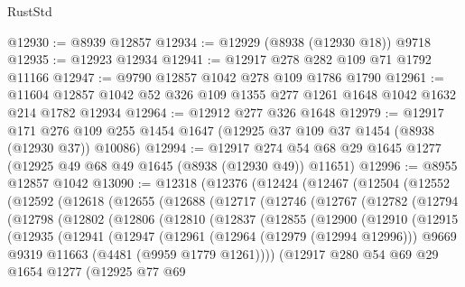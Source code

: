 \begin{lexlean}{RustStd}
\begin{coremodule}
@12930 := @8939 @12857
@12934 := @12929 (@8938 (@12930 @18)) @9718
@12935 := @12923 @12934
@12941 := @12917 @278 @282 @109 @71 @1792 @11166
@12947 := @9790 @12857 @1042 @278 @109 @1786 @1790
@12961 := @11604 @12857 @1042 @52 @326 @109 @1355 @277 @1261 @1648 @1042 @1632 @214 @1782 @12934
@12964 := @12912 @277 @326 @1648
@12979 := @12917
    @171
    @276
    @109
    @255
    @1454
    @1647
    (@12925 @37 @109 @37 @1454 (@8938 (@12930 @37)) @10086)
@12994 := @12917 @274 @54 @68 @29 @1645 @1277 (@12925 @49 @68 @49 @1645 (@8938 (@12930 @49)) @11651)
@12996 := @8955 @12857 @1042
@13090 := @12318
    (@12376
      (@12424
        (@12467
          (@12504
            (@12552
              (@12592
                (@12618
                  (@12655
                    (@12688
                      (@12717
                        (@12746
                          (@12767
                            (@12782
                              (@12794
                                (@12798
                                  (@12802
                                    (@12806
                                      (@12810
                                        (@12837
                                          (@12855
                                            (@12900
                                              (@12910
                                                (@12915
                                                  (@12935
                                                    (@12941
                                                      (@12947
                                                        (@12961
                                                          (@12964 (@12979 (@12994 @12996)))
                                                          @9669
                                                          @9319
                                                          @11663
                                                          (@4481 (@9959 @1779 @1261))))
                                                      (@12917
                                                        @280
                                                        @54
                                                        @69
                                                        @29
                                                        @1654
                                                        @1277
                                                        (@12925
                                                          @77
                                                          @69

\end{coremodule}
\end{lexlean}

